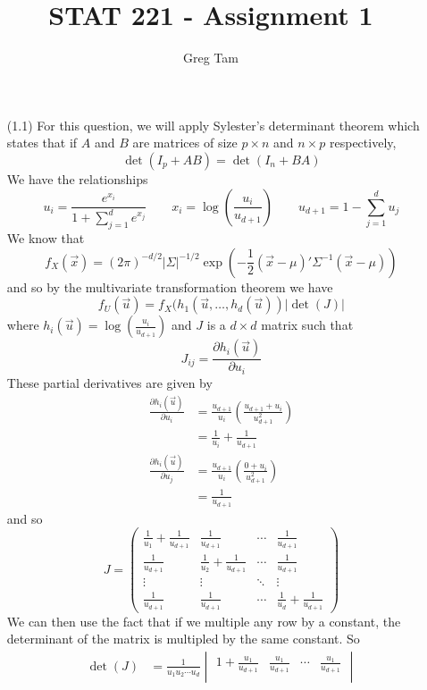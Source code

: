 \documentclass[letterpaper,10pt]{amsart}
\begin{document}
\title{STAT 221 - Assignment 1}
\author{Greg Tam}
\date{}
\maketitle


\begin{enumerate}[(1)]
\item[(1.1)]
For this question, we will apply Sylester's determinant theorem which states that if $A$ and $B$ are matrices of size $p \times n$ and $n \times p$ respectively, 
\[\det(I_p + AB) = \det(I_n  + BA)\]
We have the relationships
\[u_i = \frac{e^{x_i}}{1 + \sum_{j=1}^d e^{x_j}} \qquad x_i = \log \left(\frac{u_i}{u_{d+1}}\right) \qquad u_{d+1} = 1 - \sum_{j=1}^d u_j\]
We know that
\[f_X(\vec{x}) = (2\pi)^{-d/2} \left|\Sigma \right|^{-1/2} \exp\left(-\frac{1}{2}(\vec{x}-\mu)' \Sigma^{-1} (\vec{x}-\mu)\right)\]
and so by the multivariate transformation theorem we have
\[f_U(\vec{u}) = f_X(h_1(\vec{u},\ldots,h_d(\vec{u})) |\det(J)|\]
where $h_i(\vec{u}) = \log\left(\frac{u_i}{u_{d+1}}\right)$ and $J$ is a $d \times d$ matrix such that
\[J_{ij} = \frac{\partial h_i(\vec{u})}{\partial u_i}\]
These partial derivatives are given by
\begin{align*}
\frac{\partial h_i(\vec{u})}{\partial u_i} &= \frac{u_{d+1}}{u_i}\left(\frac{u_{d+1} + u_i}{u_{d+1}^2}\right)\\
&= \frac{1}{u_i} + \frac{1}{u_{d+1}}\\
\frac{\partial h_i(\vec{u})}{\partial u_j} &= \frac{u_{d+1}}{u_i}\left(\frac{0+u_i}{u_{d+1}^2}\right)\\
&= \frac{1}{u_{d+1}}
\end{align*}
and so 
\[J = \begin{pmatrix}
\frac{1}{u_1} + \frac{1}{u_{d+1}} & \frac{1}{u_{d+1}} & \cdots & \frac{1}{u_{d+1}}\\
\frac{1}{u_{d+1}} & \frac{1}{u_2} + \frac{1}{u_{d+1}} & \cdots & \frac{1}{u_{d+1}}\\
\vdots & \vdots & \ddots & \vdots\\
\frac{1}{u_{d+1}} & \frac{1}{u_{d+1}} & \cdots & \frac{1}{u_d} + \frac{1}{u_{d+1}}
\end{pmatrix} \]
We can then use the fact that if we multiple any row by a constant, the determinant of the matrix is multipled by the same constant. So
\begin{align*}
\det(J) &= \frac{1}{u_1 u_2 \cdots u_d} \begin{vmatrix}
1 + \frac{u_1}{u_{d+1}} & \frac{u_1}{u_{d+1}} & \cdots & \frac{u_1}{u_{d+1}}\\

\end{vmatrix}
\end{align*}
\end{enumerate}
\end{document}
